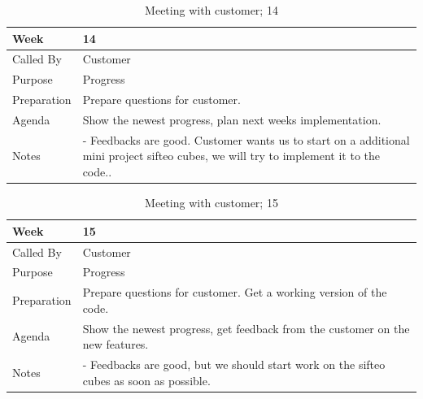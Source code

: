 {\footnotesize
\begin{table}[H]
\begin{tabular}{| p{5cm} | p{10cm} |}\hline
	\textbf{Week}	& \textbf{14} \\ \hline
	Called	By		& Customer\\ \hline
	Purpose		& Progress\\ \hline
	Preparation 
		& Prepare questions for customer. \\ 
		
	Agenda
		& Show the newest progress, plan next weeks implementation. \\

	Notes	& - Feedbacks are good. Customer wants us to start on a additional mini project sifteo cubes, we will try to implement it to the code..\\ \hline
	
\end{tabular}


\caption{Meeting with customer; 14}
\label{fig:meeting_14}
\end{table}}


{\footnotesize
\begin{table}[H]
\begin{tabular}{| p{5cm} | p{10cm} |}\hline
	\textbf{Week}	& \textbf{15} \\ \hline
	Called	By		& Customer\\ \hline
	Purpose		& Progress\\ \hline
	Preparation 
		& Prepare questions for customer. Get a working version of the code.\\ 
		
	Agenda
		& Show the newest progress, get feedback from the customer on the new features. \\

	Notes	& - Feedbacks are good, but we should start work on the sifteo cubes as soon as possible.\\ \hline
	
\end{tabular}


\caption{Meeting with customer; 15}
\label{fig:meeting_15}
\end{table}}


